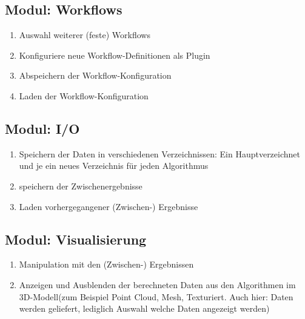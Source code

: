 	\subsection{Modul: Workflows}
		\begin{enumerate}[ align=left, label={\textbf{\textbackslash FK1\arabic*0\textbackslash}} ]
			 \item Auswahl weiterer (feste) Workflows
			 \item Konfiguriere neue Workflow-Definitionen als Plugin
			 \item Abspeichern der Workflow-Konfiguration
			 \item Laden der Workflow-Konfiguration
		\end{enumerate}
		
	\subsection{Modul: I/O}
		\begin{enumerate}[ align=left, label={\textbf{\textbackslash FK2\arabic*0\textbackslash}} ]
			\item Speichern der Daten in verschiedenen Verzeichnissen: Ein Hauptverzeichnet und je ein neues Verzeichnis für jeden Algorithmus
			\item speichern der Zwischenergebnisse
			\item Laden vorhergegangener (Zwischen-) Ergebnisse
		\end{enumerate}

	\subsection{Modul: Visualisierung}
		\begin{enumerate}[ align=left, label={\textbf{\textbackslash FK3\arabic*0\textbackslash}} ]
			 \item Manipulation mit den (Zwischen-) Ergebnissen
			 \item Anzeigen und Ausblenden der berechneten Daten aus den Algorithmen im 3D-Modell(zum Beispiel Point Cloud, Mesh, Texturiert. Auch hier: Daten werden geliefert, lediglich Auswahl welche Daten angezeigt werden)
		\end{enumerate}

